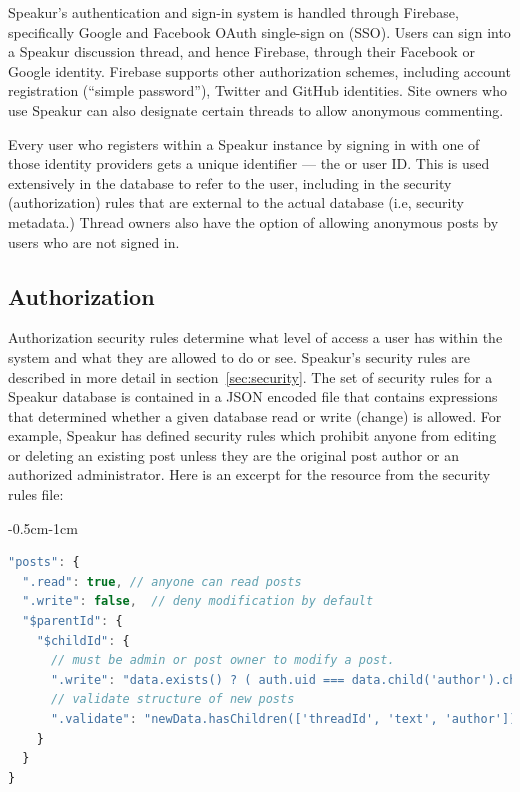 Speakur's authentication and sign-in system is handled through Firebase, 
specifically Google and Facebook OAuth single-sign on (SSO).
Users can sign into a Speakur discussion thread, and hence Firebase, through their Facebook or Google identity.
Firebase supports other authorization schemes, including account registration (``simple password''), Twitter and GitHub identities.
Site owners who use Speakur can also designate certain threads to allow anonymous commenting.

Every user who registers within a Speakur instance by signing in with one of those identity providers gets a unique identifier --- the  or user ID. 
This  is used extensively in the database to refer to the user, including in the security (authorization) rules that are external to the actual database (i.e, security metadata.) 
Thread owners also have the option of allowing anonymous posts by users who are not signed in.

\subsection{Authorization}
Authorization security rules determine what level of access a user has within the system and what they are allowed to do or see.
Speakur's security rules are described in more detail in section~\ref{sec:security}.
The set of security rules for a Speakur database is contained in a JSON encoded file that contains expressions that determined whether a given database read or write (change) is allowed. 
For example, Speakur has defined security rules which prohibit anyone from editing or deleting an existing post unless they are the original post author or an authorized administrator.
Here is an excerpt for the  resource from the security rules file:

\begin{changemargin}{-0.5cm}{-1cm}
\begin{lstlisting}[language=JavaScript,caption=
{Security rules for the \tcode{posts} table (user messages).},label=l:sec_rule1,captionpos=below]
"posts": {
  ".read": true, // anyone can read posts
  ".write": false,  // deny modification by default
  "$parentId": {
    "$childId": {
      // must be admin or post owner to modify a post.
      ".write": "data.exists() ? ( auth.uid === data.child('author').child('uid').val() || root.child('admins').child(auth.uid).child('scope').val() === '*' ) : true",
      // validate structure of new posts
      ".validate": "newData.hasChildren(['threadId', 'text', 'author']) && newData.child('timestamp').val() > 1"
    }
  }
}
\end{lstlisting}
\end{changemargin}

